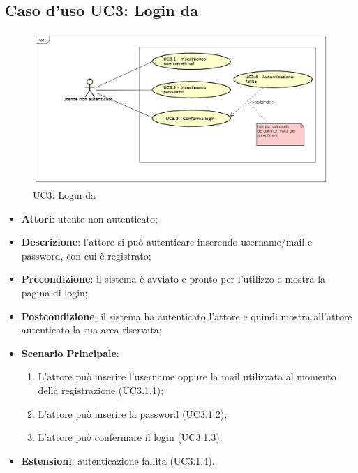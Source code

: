 \newpage
\subsection{Caso d'uso UC3: Login da \progetto}
\label{UC3}
\begin{figure}[ht]
	\centering
	\includegraphics[scale=0.48]{UML/UC3.png}
	\caption{UC3: Login da \progetto}
\end{figure}
\FloatBarrier
\begin{itemize}
	\item \textbf{Attori}: utente non autenticato;
	\item \textbf{Descrizione}: l'attore si può autenticare inserendo username/mail e password, con cui è registrato;
	\item \textbf{Precondizione}: il sistema è avviato e pronto per l'utilizzo e mostra la pagina di login;
	\item \textbf{Postcondizione}: il sistema ha autenticato l'attore e quindi mostra all'attore autenticato la sua area riservata;
	\item \textbf{Scenario Principale}:
	\begin{enumerate}
		\item L'attore può inserire l'username oppure la mail utilizzata al momento della registrazione (UC3.1.1);
		\item L'attore può inserire la password (UC3.1.2);
		\item L'attore può confermare il login (UC3.1.3).
	\end{enumerate}
	\item \textbf{Estensioni}: autenticazione fallita (UC3.1.4).
\end{itemize}

